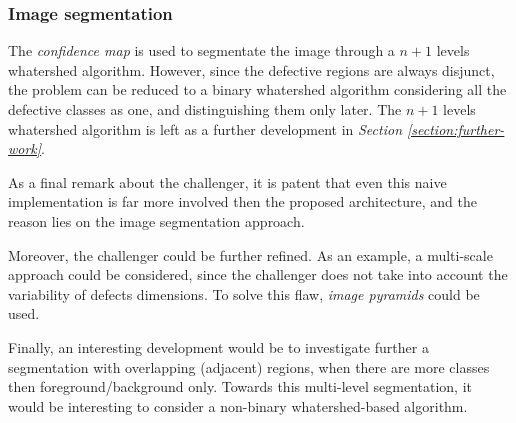 \subsubsection{Image segmentation}\label{section:challenger:image-segmentation}
\par{
	The \emph{confidence map} is used to segmentate the image through a $n+1$ levels whatershed algorithm. However, since the defective regions are always disjunct, the problem can be reduced to a binary whatershed algorithm \cite{ieee:87344} considering all the defective classes as one, and distinguishing them only later. The $n+1$ levels whatershed algorithm is left as a further development in \emph{Section \ref{section:further-work}}.
}
\par{
	As a final remark about the challenger, it is patent that even this naive implementation is far more involved then the proposed architecture, and the reason lies on the image segmentation approach.
}
\par{
	Moreover, the challenger could be further refined. As an example, a multi-scale approach could be considered, since the challenger does not take into account the variability of defects dimensions. To solve this flaw, \emph{image pyramids} could be used.
}
\par{
	Finally, an interesting development would be to investigate further a segmentation with overlapping (adjacent) regions, when there are more classes then foreground/background only. Towards this multi-level segmentation, it would be interesting to consider a non-binary whatershed-based algorithm.
}